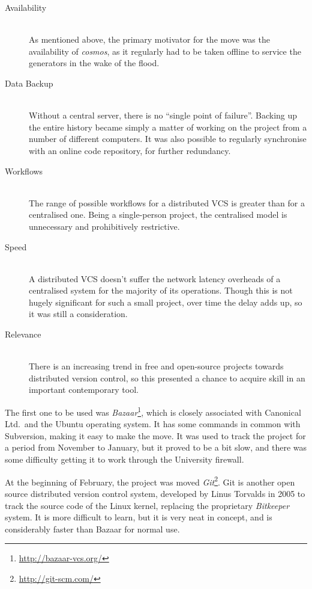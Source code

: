 \begin{description}
\item[Availability] \hfill \\
As mentioned above, the primary motivator for the move was the availability of
\emph{cosmos}, as it regularly had to be taken offline to service the generators
in the wake of the flood. 
\item[Data Backup] \hfill \\
Without a central server, there is no ``single point of failure''. Backing
up the entire history became simply a matter of working on the project from a
number of different computers. It was also possible to regularly synchronise
with an online code repository, for further redundancy.
\item[Workflows] \hfill \\
The range of possible workflows for a distributed VCS is greater than for a
centralised one. Being a single-person project, the centralised model is
unnecessary and prohibitively restrictive.
\item[Speed] \hfill \\
A distributed VCS doesn't suffer the network latency overheads of a centralised
system for the majority of its operations. Though this is not hugely significant
for such a small project, over time the delay adds up, so it was still a
consideration.
\item[Relevance] \hfill \\
There is an increasing trend in free and open-source projects towards
distributed version control, so this presented a chance to acquire skill in an
important contemporary tool.
\end{description}

The first one to be used was
\emph{Bazaar}\footnote{\url{http://bazaar-vcs.org/}}, which is closely
associated with Canonical Ltd.\ and the Ubuntu operating system. It has some
commands in common with Subversion, making it easy to make the move. It was used
to track the project for a period from November to January, but it proved to be
a bit slow, and there was some difficulty getting it to work through the
University firewall.

At the beginning of February, the project was moved
\emph{Git}\footnote{\url{http://git-scm.com/}}. Git is another open source
distributed version control system, developed by Linus Torvalds in 2005 to track
the source code of the Linux kernel, replacing the proprietary \emph{Bitkeeper}
system. It is more difficult to learn, but it is very neat in concept, and is
considerably faster than Bazaar for normal use.

